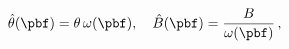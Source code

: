 \begin{equation}
{\hat \theta} (\pbf) = \theta \,\omega(\pbf), \quad
{\hat B} (\pbf) = \frac{B}{\omega(\pbf)}\, ,
\label{thetaB(p)}
\end{equation}


